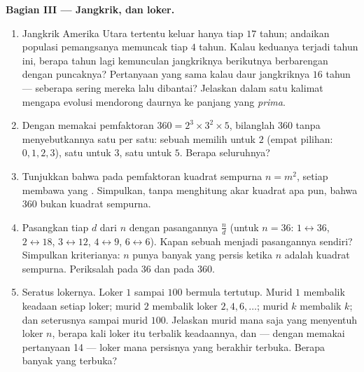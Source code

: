 \begin{problem}
\medskip
\noindent\textbf{Bagian III --- Jangkrik,  dan loker.}
\begin{enumerate}[resume]
  \item Jangkrik Amerika Utara tertentu keluar hanya tiap $17$
        tahun; andaikan populasi pemangsanya memuncak tiap $4$
        tahun. Kalau keduanya terjadi tahun ini, berapa tahun lagi
        kemunculan jangkriknya berikutnya berbarengan dengan
        puncaknya? Pertanyaan yang sama kalau daur jangkriknya
        $16$ tahun --- seberapa sering mereka lalu dibantai?
        Jelaskan dalam satu kalimat mengapa evolusi mendorong
        daurnya ke panjang yang \emph{prima}.
  \item Dengan memakai pemfaktoran $360 = 2^3 \times 3^2 \times 5$,
        bilanglah  $360$ tanpa menyebutkannya satu per satu:
        sebuah  memilih  untuk $2$ (empat pilihan:
        $0, 1, 2, 3$), satu untuk $3$, satu untuk $5$. Berapa
         seluruhnya?
  \item Tunjukkan bahwa pada pemfaktoran kuadrat sempurna
        $n = m^2$, setiap  membawa  yang
        \emph{}. Simpulkan, tanpa menghitung akar kuadrat apa
        pun, bahwa $360$ bukan kuadrat sempurna.
  \item Pasangkan tiap  $d$ dari $n$ dengan pasangannya
        $\frac{n}{d}$ (untuk $n = 36$: $1 \leftrightarrow 36$,
        $2 \leftrightarrow 18$, $3 \leftrightarrow 12$,
        $4 \leftrightarrow 9$, $6 \leftrightarrow 6$). Kapan sebuah
         menjadi pasangannya sendiri? Simpulkan kriterianya:
        $n$ punya banyak  yang \emph{} persis ketika
        $n$ adalah kuadrat sempurna. Periksalah pada $36$ dan pada $360$.
  \item Seratus lokernya. Loker $1$ sampai $100$ bermula tertutup.
        Murid $1$ membalik keadaan setiap loker; murid $2$ membalik
        loker $2, 4, 6, \dots$; murid $k$ membalik
         $k$; dan seterusnya sampai murid $100$. Jelaskan
        murid mana saja yang menyentuh loker $n$, berapa kali loker
        itu terbalik keadaannya, dan --- dengan memakai pertanyaan
        14 --- loker mana persisnya yang berakhir terbuka. Berapa
        banyak yang terbuka?

\end{enumerate}
\end{problem}
